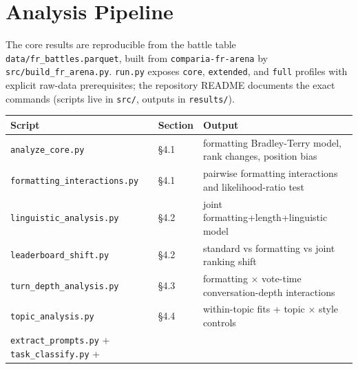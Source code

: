 \documentclass[
]{article}
\newcounter{none} %
\begin{document}
\clearpage
\appendix
\section{Analysis Pipeline}\label{appendix-a-analysis-pipeline}

The core results are reproducible from the battle table
\nolinkurl{data/fr_battles.parquet}, built from
\nolinkurl{comparia-fr-arena} by
\nolinkurl{src/build_fr_arena.py}. \nolinkurl{run.py} exposes
\texttt{core}, \texttt{extended}, and \texttt{full} profiles with
explicit raw-data prerequisites; the repository README documents the
exact commands (scripts live in \texttt{src/}, outputs in
\texttt{results/}).

{\def\LTcaptype{none} %
\footnotesize
\setlength{\tabcolsep}{3pt}
\renewcommand{\arraystretch}{0.95}
\begin{longtable}[]{@{}
  >{\raggedright\arraybackslash}p{}
  >{\raggedright\arraybackslash}p{}
  >{\raggedright\arraybackslash}p{}@{}}
\toprule\noalign{}
\begin{minipage}[b]{\linewidth}\raggedright
Script
\end{minipage} & \begin{minipage}[b]{\linewidth}\raggedright
Section
\end{minipage} & \begin{minipage}[b]{\linewidth}\raggedright
Output
\end{minipage} \\
\midrule\noalign{}
\endhead
\bottomrule\noalign{}
\endlastfoot
\texttt{analyze\_core.py} & §4.1 & formatting Bradley-Terry model,
rank changes, position bias \\
\texttt{formatting\_interactions.py} & §4.1 & pairwise formatting
interactions and likelihood-ratio test \\
\texttt{linguistic\_analysis.py} & §4.2 & joint
formatting+length+linguistic model \\
\texttt{leaderboard\_shift.py} & §4.2 & standard vs formatting vs joint
ranking shift \\
\texttt{turn\_depth\_analysis.py} & §4.3 & formatting × vote-time
conversation-depth interactions \\
\texttt{topic\_analysis.py} & §4.4 & within-topic fits + topic × style
controls \\
\texttt{extract\_prompts.py} + \texttt{task\_classify.py} +

\end{longtable}}
\end{document}
